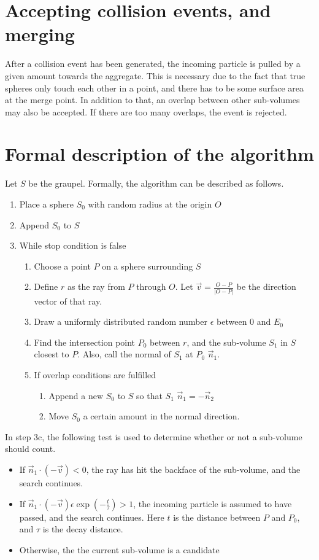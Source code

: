 \documentclass[a4paper,10pt]{scrartcl}
\begin{document}
\section{Accepting collision events, and merging}
After a collision event has been generated, the incoming particle is pulled by a given amount towards the aggregate. This is necessary due to the fact that true spheres only touch each other in a point, and there has to be some surface area at the merge point. In addition to that, an overlap between other sub-volumes may also be accepted. If there are too many overlaps, the event is rejected.

\section{Formal description of the algorithm}
Let $S$ be the graupel. Formally, the algorithm can be described as follows.
\begin{enumerate}
 \item Place a sphere $S_0$ with random radius at the origin $O$
 \item Append $S_0$ to $S$
 \item While stop condition is false
 \begin{enumerate}
  \item Choose a point $P$ on a sphere surrounding $S$
  \item Define $r$ as the ray from $P$ through $O$. Let $\vec{v}=\frac{O-P}{|O - P|}$ be the direction vector of that ray.
  \item Draw a uniformly distributed random number $\epsilon$ between 0 and $E_0$
  \item Find the intersection point $P_0$ between $r$, and the sub-volume $S_1$ in $S$ closest to $P$. Also, call the normal of $S_1$ at $P_0$ $\vec{n}_1$.
  \item If overlap conditions are fulfilled
  \begin{enumerate}
  \item Append a new $S_0$ to $S$ so that $S_1$ $\vec{n}_1=-\vec{n}_2$
  \item Move $S_0$ a certain amount in the normal direction.
  \end{enumerate}
 \end{enumerate}
\end{enumerate}

In step 3c, the following test is used to determine whether or not a sub-volume should count.
\begin{itemize}
 \item If $\vec{n}_1\cdot\left(-\vec{v}\right) < 0$, the ray has hit the backface of the sub-volume, and the search continues.
 \item If $\vec{n}_1\cdot\left(-\vec{v}\right)\epsilon \exp\left(-\frac{t}{\tau}\right)>1$, the incoming particle is assumed to have passed, and the search continues. Here $t$ is the distance between $P$ and $P_0$, and $\tau$ is the decay distance.
 \item Otherwise, the the current sub-volume is a candidate
\end{itemize}
\end{document}

